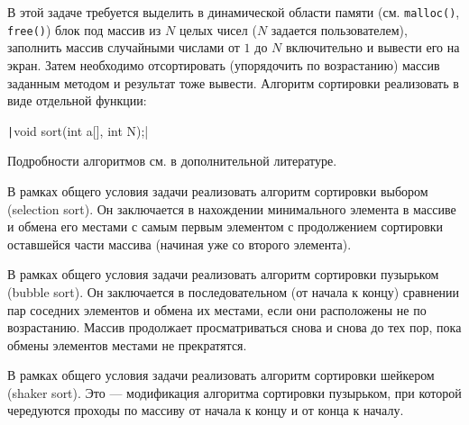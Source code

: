
В этой задаче требуется выделить в динамической области памяти 
(см. \texttt{malloc()}, \texttt{free()}) блок под 
массив из $N$ целых чисел ($N$ задается пользователем), заполнить массив
случайными числами от $1$ до $N$ включительно и вывести его на экран. Затем 
необходимо отсортировать (упорядочить по возрастанию) массив заданным методом 
и результат тоже вывести. Алгоритм сортировки реализовать в виде отдельной функции:

\texttt|void sort(int a[], int N);|

Подробности алгоритмов см. в дополнительной литературе.

\begin{zztask}
В рамках общего условия задачи реализовать алгоритм 
сортировки выбором (selection sort). Он заключается в нахождении минимального элемента
в массиве и обмена его местами с самым первым элементом с продолжением сортировки оставшейся
части массива (начиная уже со второго элемента).
\end{zztask}

\begin{zztask}
В рамках общего условия задачи реализовать алгоритм 
сортировки пузырьком (bubble sort). Он заключается в последовательном (от начала к концу)
сравнении пар соседних элементов и обмена их местами, если они расположены 
не по возрастанию. Массив продолжает просматриваться снова и снова до 
тех пор, пока обмены элементов местами не прекратятся.
\end{zztask}

\begin{zztask}
В рамках общего условия задачи реализовать алгоритм 
сортировки шейкером (shaker sort). Это --- модификация алгоритма сортировки пузырьком,
при которой чередуются проходы по массиву от начала к концу и от конца к началу.
\end{zztask}

